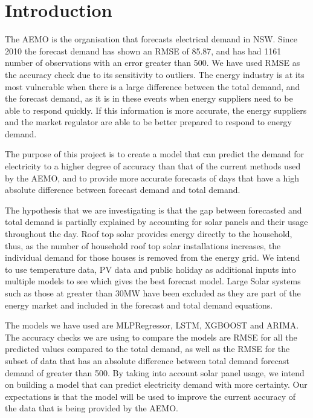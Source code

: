 \documentclass[mstat,12pt]{unswthesis}
\begin{document}



\hypertarget{introduction}{%
\chapter{Introduction}\label{introduction}}

The AEMO is the organisation that forecasts electrical demand in
NSW\cite{data}. Since 2010 the forecast demand has shown an RMSE of
85.87, and has had 1161 number of observations with an error greater
than 500. We have used RMSE as the accuracy check due to its sensitivity
to outliers. The energy industry is at its most vulnerable when there is
a large difference between the total demand, and the forecast demand, as
it is in these events when energy suppliers need to be able to respond
quickly. If this information is more accurate, the energy suppliers and
the market regulator are able to be better prepared to respond to energy
demand.

The purpose of this project is to create a model that can predict the
demand for electricity to a higher degree of accuracy than that of the
current methods used by the AEMO, and to provide more accurate forecasts
of days that have a high absolute difference between forecast demand and
total demand\cite{johnson_2019_evaluating}.

The hypothesis that we are investigating is that the gap between
forecasted and total demand is partially explained by accounting for
solar panels and their usage throughout the day. Roof top solar provides
energy directly to the household, thus, as the number of household roof
top solar installations increases, the individual demand for those
houses is removed from the energy grid. We intend to use temperature
data, PV data and public holiday as additional inputs into multiple
models to see which gives the best forecast model. Large Solar systems
such as those at greater than 30MW have been excluded as they are part
of the energy market and included in the forecast and total demand
equations\cite{aemo_2020_projections}.

The models we have used are MLPRegressor, LSTM, XGBOOST and ARIMA. The
accuracy checks we are using to compare the models are RMSE for all the
predicted values compared to the total demand, as well as the RMSE for
the subset of data that has an absolute difference between total demand
forecast demand of greater than 500. By taking into account solar panel
usage, we intend on building a model that can predict electricity demand
with more certainty. Our expectations is that the model will be used to
improve the current accuracy of the data that is being provided by the
AEMO.
\end{document}
